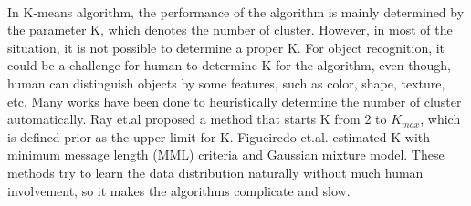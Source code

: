 ﻿\\
In K-means algorithm, the performance of the algorithm is mainly determined by the parameter K, which denotes the number of cluster. However, in most of the situation, it is not possible to determine a proper K. For object recognition, it could be a challenge for human to determine K for the algorithm, even though, human can distinguish objects by some features, such as color, shape, texture, etc. Many works have been done to heuristically determine the number of cluster automatically. Ray et.al \cite{ray1999determination} proposed a method that starts K from 2 to $K_{max}$, which is defined prior as the upper limit for K. Figueiredo et.al. \cite{figueiredo2002unsupervised} estimated K with minimum message length (MML) criteria and Gaussian mixture model. These methods try to learn the data distribution naturally without much human involvement, so it makes the algorithms complicate and slow. 

